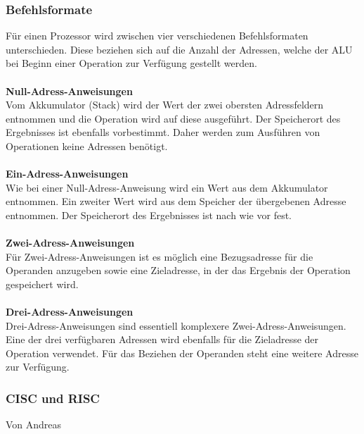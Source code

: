 \documentclass[12pt]{article}
\begin{document}
\subsubsection{Befehlsformate}
Für einen Prozessor wird zwischen vier verschiedenen Befehlsformaten unterschieden. Diese beziehen sich auf die Anzahl der Adressen, welche der ALU bei Beginn einer Operation zur Verfügung gestellt werden.\\ \\
\textbf{Null-Adress-Anweisungen}\\
Vom Akkumulator (Stack) wird der Wert der zwei obersten Adressfeldern entnommen und die Operation wird auf diese ausgeführt. Der Speicherort des Ergebnisses ist ebenfalls vorbestimmt. Daher werden zum Ausführen von Operationen keine Adressen benötigt.\\ \\
\textbf{Ein-Adress-Anweisungen}\\
Wie bei einer Null-Adress-Anweisung wird ein Wert aus dem Akkumulator entnommen. Ein zweiter Wert wird aus dem Speicher der übergebenen Adresse entnommen. Der Speicherort des Ergebnisses ist nach wie vor fest.\\ \\
\textbf{Zwei-Adress-Anweisungen}\\
Für Zwei-Adress-Anweisungen ist es möglich eine Bezugsadresse für die Operanden anzugeben sowie eine Zieladresse, in der das Ergebnis der Operation gespeichert wird.\\ \\
\textbf{Drei-Adress-Anweisungen}\\
Drei-Adress-Anweisungen sind essentiell komplexere Zwei-Adress-Anweisungen. Eine der drei verfügbaren Adressen wird ebenfalls für die Zieladresse der Operation verwendet. Für das Beziehen der Operanden steht eine weitere Adresse zur Verfügung.\\

\subsubsection{CISC und RISC}
Von Andreas\\
\end{document}
